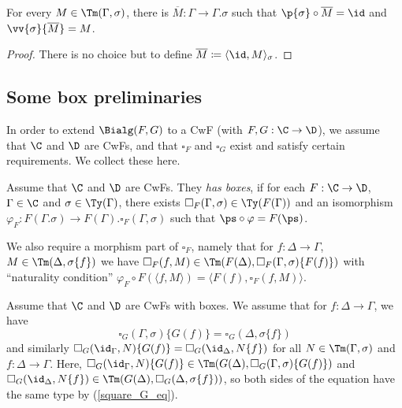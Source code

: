 \documentclass{article}
\newcommand{\isoGR}{\ensuremath{\phi_{G\rightarrow}}}
\newcommand{\isoGL}{\ensuremath{\phi_{G\leftarrow}}}
\begin{document}
\begin{lemma}
  For every $M \in \Tm(\Gamma, \sigma)$, there is $\overline{M} :
  \Gamma \to \Gamma.\sigma$ such that $\p{\sigma} \circ \overline{M} =
  \id$ and $\vv{\sigma}\{\overline{M}\} = M$.
\end{lemma}
\begin{proof}
  There is no choice but to define $\overline{M} \coloneqq \langle \id, M\rangle_{\sigma}$.
\end{proof}

\subsection{Some box preliminaries}

In order to extend $\Bialg(F, G)$ to a CwF (with $F, G : \C \to \D$),
we assume that $\C$ and $\D$ are CwFs, and that $\square_F$ and
$\square_G$ exist and satisfy certain requirements. We collect these here.

\begin{definition}
  Assume that $\C$ and $\D$ are CwFs. They \emph{has boxes}, if for
  each $F : \C \to \D$, $\Gamma \in \C$ and $\sigma \in \Ty(\Gamma)$,
  there exists $\square_F(\Gamma, \sigma) \in \Ty(F(\Gamma))$ and an
  isomorphism $\varphi_F : F(\Gamma.\sigma) \to F(\Gamma).\square_F(\Gamma, \sigma)$
  such that $\ps \circ \varphi = F(\ps)$.

  We also require a morphism part of $\square_F$, namely that
  for $f : \Delta \to \Gamma$, $M \in \Tm(\Delta, \sigma\{f\})$ we
  have $\square_F(f, M) \in \Tm(F(\Delta), \square_F(\Gamma,
  \sigma)\{F(f)\})$ with ``naturality condition'' $\varphi_F \circ
  F(\langle f , M\rangle) = \langle F(f), \square_F(f, M)\rangle$.
\end{definition}


Assume that $\C$ and $\D$ are CwFs with boxes. We assume that for $f :
\Delta \to \Gamma$, we have
 \begin{equation} \label{square_G_eq}
 \square_G(\Gamma, \sigma)\{G(f)\} = \square_G(\Delta, \sigma\{f\})
 \end{equation}
 and similarly $\square_G(\id_{\Gamma}, N)\{G(f)\} =
 \square_G(\id_{\Delta}, N\{f\})$ for all $N \in \Tm(\Gamma, \sigma)$
 and $f : \Delta \to \Gamma$. Here, $\square_G(\id_{\Gamma},
 N)\{G(f)\} \in \Tm(G(\Delta), \square_G(\Gamma, \sigma)\{G(f)\})$ and
 $\square_G(\id_{\Delta}, N\{f\}) \in \Tm(G(\Delta), \square_G(\Delta,
 \sigma\{f\}))$, so both sides of the equation have the same type by
 (\ref{square_G_eq}).
\end{document}
